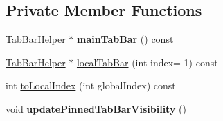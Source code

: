 \subsection*{Private Member Functions}
\begin{DoxyCompactItemize}
\item 
\hypertarget{class_combo_tab_bar_a3aa53aae4c3040bb27ac6065267b4db1}{
\hyperlink{class_tab_bar_helper}{TabBarHelper} $\ast$ {\bfseries mainTabBar} () const }
\label{class_combo_tab_bar_a3aa53aae4c3040bb27ac6065267b4db1}

\item 
\hyperlink{class_tab_bar_helper}{TabBarHelper} $\ast$ \hyperlink{class_combo_tab_bar_a262d76912a414546f74bb804de6abe9c}{localTabBar} (int index=-\/1) const 
\item 
int \hyperlink{class_combo_tab_bar_ac37381dc0f5d788b9d21508fecec6013}{toLocalIndex} (int globalIndex) const 
\item 
\hypertarget{class_combo_tab_bar_a146ca78e63ab40b476685be5d87166f1}{
void {\bfseries updatePinnedTabBarVisibility} ()}
\label{class_combo_tab_bar_a146ca78e63ab40b476685be5d87166f1}

\end{DoxyCompactItemize}
